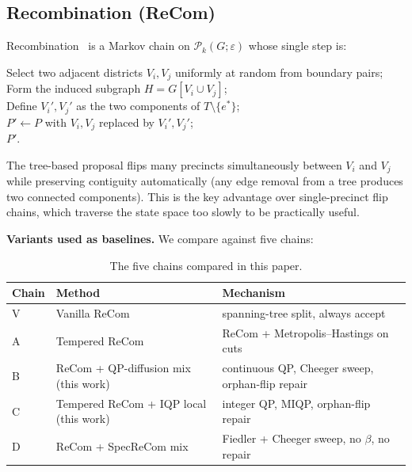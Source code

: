 \documentclass[11pt]{article}
\begin{document}
\subsection{Recombination (ReCom)}\label{sec:background-recom}

Recombination~\cite{deford2021recombination} is a Markov chain on
$\mathcal{P}_k(G; \varepsilon)$ whose single step is:

\begin{algorithm}[H]
\caption{Vanilla ReCom step (Chain V)}\label{alg:recom}
Select two adjacent districts $V_i, V_j$ uniformly at random from boundary pairs;\\
Form the induced subgraph $H = G[V_i \cup V_j]$;\\
Define $V_i', V_j'$ as the two components of $T \setminus \{e^*\}$;\\
$P' \gets P$ with $V_i, V_j$ replaced by $V_i', V_j'$;\\
\Return $P'$.
\end{algorithm}

\noindent The tree-based proposal flips many precincts simultaneously
between $V_i$ and $V_j$ while preserving contiguity automatically (any
edge removal from a tree produces two connected components). This is
the key advantage over single-precinct flip chains, which traverse the
state space too slowly to be practically useful.

\textbf{Variants used as baselines.} We compare against five chains:

\begin{table}[H]
\centering
\small
\begin{tabular}{lll}
\toprule
Chain & Method & Mechanism \\
\midrule
V & Vanilla ReCom~\cite{deford2021recombination} & spanning-tree split, always accept \\
A & Tempered ReCom & ReCom + Metropolis--Hastings on cuts \\
B & ReCom + QP-diffusion mix (this work) & continuous QP, Cheeger sweep, orphan-flip repair \\
C & Tempered ReCom + IQP local (this work) & integer QP, MIQP, orphan-flip repair \\
D & ReCom + SpecReCom mix~\cite{davies2025spectral} & Fiedler + Cheeger sweep, no $\beta$, no repair \\
\bottomrule
\end{tabular}
\caption{The five chains compared in this paper.}
\label{tab:five-chains}
\end{table}
\end{document}
